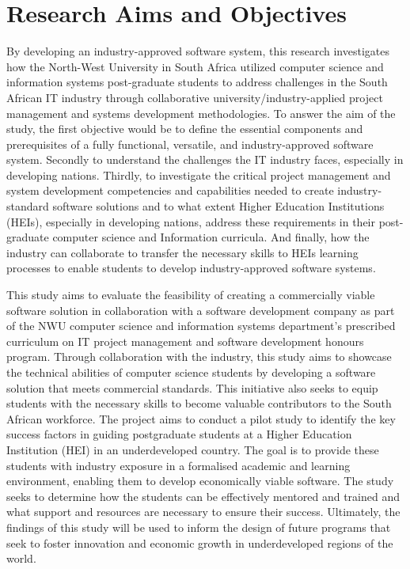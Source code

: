 \section{Research Aims and Objectives}
\par{By developing an industry-approved software system, this research investigates how the North-West University in South 
Africa utilized computer science and information systems post-graduate students to address challenges in the South African 
IT industry through collaborative university/industry-applied project management and systems development methodologies.
To answer the aim of the study, the first objective would be to define the essential components and prerequisites of a 
fully functional, versatile, and industry-approved software system. Secondly to understand the challenges the IT industry 
faces, especially in developing nations.  Thirdly, to investigate the critical project management and system development 
competencies and capabilities needed to create industry-standard software solutions and to what extent Higher Education 
Institutions (HEIs), especially in developing nations, address these requirements in their post-graduate computer science 
and Information curricula. And finally, how the industry can collaborate to transfer the necessary skills to HEIs learning 
processes to enable students to develop industry-approved software systems. }
\par{This study aims to evaluate the feasibility of creating a commercially viable software solution in
collaboration with a software development company as part of the NWU computer science and information systems department's 
prescribed curriculum on IT project management and software development honours program. Through collaboration with the 
industry, this study aims to showcase the technical abilities of computer science students by developing a software 
solution that meets commercial standards. This initiative also seeks to equip students with the necessary skills to become 
valuable contributors to the South African workforce. The project aims to conduct a pilot study to identify the key success 
factors in guiding postgraduate students at a Higher Education Institution (HEI) in an underdeveloped country. The goal is 
to provide these students with industry exposure in a formalised academic and learning environment, enabling them to 
develop economically viable software. The study seeks to determine how the students can be effectively mentored and trained 
and what support and resources are necessary to ensure their success.
Ultimately, the findings of this study will be used to inform the design of future programs that seek to foster innovation 
and economic growth in underdeveloped regions of the world.}
